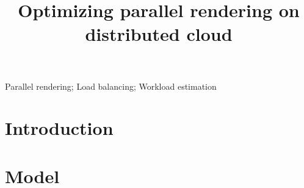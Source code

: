 \documentclass[10pt, conference, compsocconf]{IEEEtran}
\begin{document}
%
\title{Optimizing parallel rendering on distributed cloud}



\author{
\and
{}
}

\maketitle

\setlength{\abovecaptionskip}{0pt}
\setlength{\belowcaptionskip}{0pt}
\setlength{\intextsep}{1pt}
\setlength{\dbltextfloatsep}{3pt}
\setlength{\textfloatsep}{3pt}


\begin{abstract}

\end{abstract}

\begin{IEEEkeywords}

Parallel rendering; Load balancing; Workload estimation

\end{IEEEkeywords}


%
\IEEEpeerreviewmaketitle


\section{Introduction} \label{Introduction}

\section{Model} \label{Model}
\end{document}
